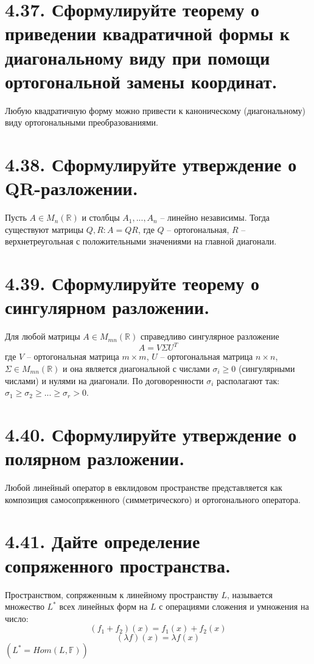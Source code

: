 \documentclass{article}
\begin{document}
\section*{\LARGE 4.37. Сформулируйте теорему о приведении квадратичной формы к диагональному виду при помощи ортогональной замены координат. }
Любую квадратичную форму можно привести к каноническому (диагональному) виду ортогональными преобразованиями.

\section*{\LARGE 4.38. Сформулируйте утверждение о QR-разложении.}
Пусть $A \in M_n(\mathbb{R})$ и столбцы $A_1, ... , A_n$ -- линейно независимы. Тогда существуют матрицы $Q, R : A = QR$, где $Q$ -- ортогональная, $R$ -- верхнетреугольная с положительными значениями на главной диагонали.

\section*{\LARGE 4.39. Сформулируйте теорему о сингулярном разложении.}
Для любой матрицы $A \in M_{mn}(\mathbb{R})$ справедливо сингулярное разложение 
$$A = V \Sigma U^T$$
где $V$ -- ортогональная матрица $m\times m$, $U$ -- ортогональная матрица $n\times n$, $\Sigma \in M_{mn}(\mathbb{R})$ и она является диагональной с числами $\sigma_i \ge 0$ (сингулярными числами) и нулями на диагонали.
\newline По договоренности $\sigma_i$ располагают так: $\sigma_1 \ge \sigma_2 \ge ... \ge \sigma_r > 0$.

\section*{\LARGE 4.40. Сформулируйте утверждение о полярном разложении.}
Любой линейный оператор в евклидовом пространстве представляется как композиция самосопряженного (симметрического) и ортогонального оператора. 

\section*{\LARGE 4.41. Дайте определение сопряженного пространства.}
Пространством, сопряженным к линейному пространству $L$, называется множество $L^*$ всех линейных форм на $L$ с операциями сложения и умножения на число:
$$(f_1 + f_2)(x) = f_1(x) + f_2(x)$$
$$(\lambda f)(x) = \lambda f(x)$$
$(L^* = Hom(L, \mathbb{F}))$
\end{document}
